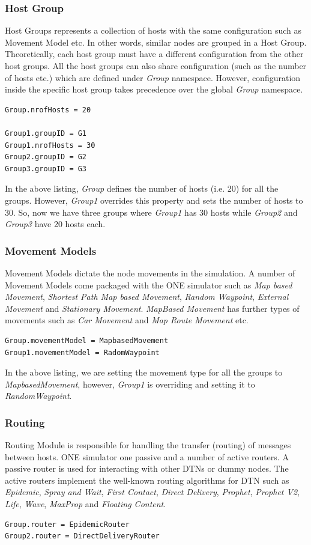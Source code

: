 \subsubsection{Host Group}
Host Groups represents a collection of hosts with the same configuration such as Movement Model etc. In other words, similar nodes are grouped in a Host Group. Theoretically, each host group must have a different configuration from the other host groups. All the host groups can also share configuration (such as the number of hosts etc.) which are defined under \textit{Group} namespace. However, configuration inside the specific host group takes precedence over the global \textit{Group} namespace.
\begin{lstlisting}[language=bash]
Group.nrofHosts = 20

Group1.groupID = G1
Group1.nrofHosts = 30
Group2.groupID = G2
Group3.groupID = G3
\end{lstlisting}

In the above listing, \textit{Group} defines the number of hosts (i.e. 20) for all the groups. However, \textit{Group1} overrides this property and sets the number of hosts to 30. So, now we have three groups where \textit{Group1} has 30 hosts while \textit{Group2} and \textit{Group3} have 20 hosts each.

\subsubsection{Movement Models}
Movement Models dictate the node movements in the simulation. A number of Movement Models come packaged with the ONE simulator such as \textit{Map based Movement}, \textit{Shortest Path Map based Movement}, \textit{Random Waypoint}, \textit{External Movement} and \textit{Stationary Movement}. \textit{MapBased Movement} has further types of movements such as \textit{Car Movement} and \textit{Map Route Movement} etc.
\begin{lstlisting}[language=bash]
Group.movementModel = MapbasedMovement
Group1.movementModel = RadomWaypoint
\end{lstlisting}

In the above listing, we are setting the movement type for all the groups to \textit{MapbasedMovement}, however, \textit{Group1} is overriding and setting it to \textit{RandomWaypoint}.

\subsubsection{Routing}
Routing Module is responsible for handling the transfer (routing) of messages between hosts. ONE simulator one passive and a number of active routers. A passive router is used for interacting with other DTNs or dummy nodes. The active routers implement the well-known routing algorithms for DTN such as \textit{Epidemic}, \textit{Spray and Wait}, \textit{First Contact}, \textit{Direct Delivery}, \textit{Prophet}, \textit{Prophet V2}, \textit{Life}, \textit{Wave}, \textit{MaxProp} and \textit{Floating Content}.
\begin{lstlisting}[language=bash]
Group.router = EpidemicRouter
Group2.router = DirectDeliveryRouter
\end{lstlisting}

